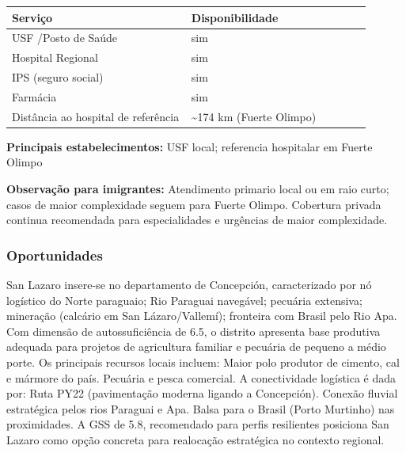 {\def\LTcaptype{none} %
\begin{longtable}{@{}>{\raggedright\arraybackslash}p{0.45\linewidth} >{\raggedright\arraybackslash}p{0.45\linewidth}@{}}
\toprule\noalign{}
Serviço & Disponibilidade \\
\midrule\noalign{}
\endhead
\bottomrule\noalign{}
\endlastfoot
USF /\allowbreak \allowbreak  Posto de Saúde & sim \\
Hospital Regional & sim \\
IPS (seguro social) & sim \\
Farmácia & sim \\
Distância ao hospital de referência & \textasciitilde174 km (Fuerte
Olimpo) \\
\end{longtable}
}

\textbf{Principais estabelecimentos:} USF local; referencia hospitalar
em Fuerte Olimpo

\textbf{Observação para imigrantes:} Atendimento primario local ou em
raio curto; casos de maior complexidade seguem para Fuerte Olimpo.
Cobertura privada continua recomendada para especialidades e urgências
de maior complexidade.
\newpage

\subsubsection*{Oportunidades}\label{oport-san-lazaro-0106}
San Lazaro insere-se no departamento de Concepción, caracterizado por nó logístico do Norte paraguaio; Rio Paraguai navegável; pecuária extensiva; mineração (calcário em San Lázaro/Vallemí); fronteira com Brasil pelo Rio Apa. Com dimensão de autossuficiência de 6.5, o distrito apresenta base produtiva adequada para projetos de agricultura familiar e pecuária de pequeno a médio porte. Os principais recursos locais incluem: Maior polo produtor de cimento, cal e mármore do país. Pecuária e pesca comercial. A conectividade logística é dada por: Ruta PY22 (pavimentação moderna ligando a Concepción). Conexão fluvial estratégica pelos rios Paraguai e Apa. Balsa para o Brasil (Porto Murtinho) nas proximidades. A GSS de 5.8, recomendado para perfis resilientes posiciona San Lazaro como opção concreta para realocação estratégica no contexto regional.


